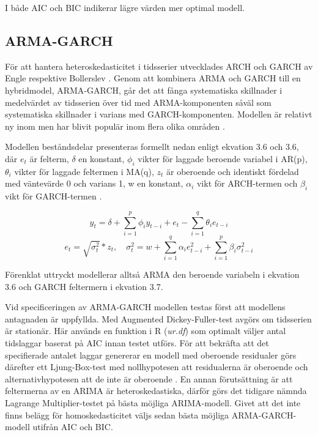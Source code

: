 \documentclass[11pt]{article}
\numberwithin{equation}{section}
\numberwithin{table}{section}
\numberwithin{figure}{section}
\begin{document}
I både AIC och BIC indikerar lägre värden mer optimal modell. 

\subsection{ARMA-GARCH}
För att hantera heteroskedasticitet i tidsserier utvecklades ARCH och GARCH av Engle \parencite*{engle1982autoregressive} respektive Bollerslev \parencite*{bollerslev1986generalized}. Genom att kombinera ARMA och GARCH till en hybridmodel, ARMA-GARCH, går det att fånga systematiska skillnader i medelvärdet av tidsserien över tid med ARMA-komponenten såväl som systematiska skillnader i varians med GARCH-komponenten. Modellen är relativt ny inom men har blivit populär inom flera olika områden \parencite{chen2011short}. 

Modellen beståndsdelar presenteras formellt nedan enligt ekvation 3.6 och 3.6, där \(e_t\) är felterm, \(\delta\) en konstant, \(\phi_i\) vikter för laggade beroende variabel i AR(p), \(\theta_i\) vikter för laggade feltermen i MA(q), \(z_t\) är oberoende och identiskt fördelad med väntevärde 0 och varians 1, w en konstant, \(\alpha_i\) vikt för ARCH-termen och \(\beta_i\) vikt för GARCH-termen \parencite[][,s.507 ff.]{bollerslev1986generalized, montgomery2015forecasting}.

\begin{equation}
    y_t = \delta + \sum_{i=1}^{p}\phi_iy_{t-i}  +e_t - \sum_{i=1}^{q}\theta_i e_{t-i} 
\end{equation}
\begin{equation}
    e_t=\sqrt{\sigma_t^2}*z_t,\quad \sigma^2_t=w + \sum_{i=1}^{q}\alpha_i e^2_{t-i} + \sum_{i=1}^{p}\beta_i \sigma^2_{t-i}
\end{equation}

Förenklat uttryckt modellerar alltså ARMA den beroende variabeln i ekvation 3.6 och GARCH feltermern i ekvation 3.7. 

Vid specificeringen av ARMA-GARCH modellen testas först att modellens antagnaden är uppfyllda. Med Augmented Dickey-Fuller-test avgörs om tidsserien är stationär. Här används en funktion  i R (\textit{ur.df}) som optimalt väljer antal tidslaggar baserat på AIC innan testet utförs.  För att bekräfta att det specifierade antalet laggar genererar en modell med oberoende residualer görs därefter ett Ljung-Box-test med nollhypotesen att residualerna är oberoende och alternativhypotesen att de inte är oberoende \parencite{box1970distribution}. En annan förutsättning är att feltermerna av en ARIMA är heteroskedastiska, därför görs det tidigare nämnda Lagrange Multiplier-testet på bästa möjliga ARIMA-modell. Givet att det inte finns belägg för homoskedasticitet väljs sedan bästa möjliga ARMA-GARCH-modell utifrån AIC och BIC. 
\end{document}
